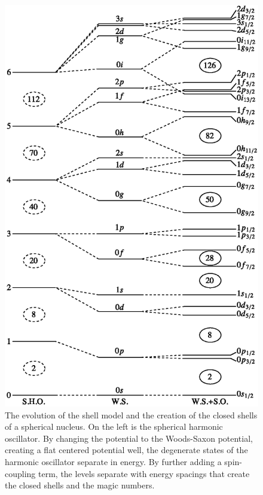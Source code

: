 \begin{figure}
    \centering
    \includegraphics[scale=0.8]{Introduction_Figs/Shellmodel.eps}
    \caption{The evolution of the shell model and the creation of the closed shells of a spherical nucleus. On the left is the spherical harmonic oscillator. By changing the potential to the Woods-Saxon potential, creating a flat centered potential well, the degenerate states of the harmonic oscillator separate in energy. By further adding a spin-coupling term, the levels separate with energy spacings that create the closed shells and the magic numbers.}
    \label{fig:shellmodel}
\end{figure}